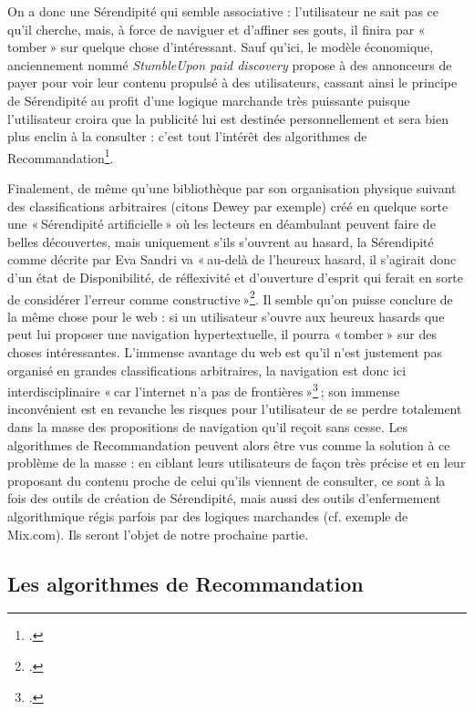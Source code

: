 On a donc une Sérendipité qui semble associative : l’utilisateur ne sait pas ce qu’il cherche, mais, à force de naviguer et d’affiner ses gouts, il finira par « tomber » sur quelque chose d’intéressant. Sauf qu’ici, le modèle économique, anciennement nommé \textit{StumbleUpon paid discovery} propose à des annonceurs de payer pour voir leur contenu propulsé à des utilisateurs, cassant ainsi le principe de Sérendipité au profit d’une logique marchande très puissante puisque l’utilisateur croira que la publicité lui est destinée personnellement et sera bien plus enclin à la consulter : c’est tout l’intérêt des algorithmes de Recommandation\footcite{author2012}.

Finalement, de même qu’une bibliothèque par son organisation physique suivant des classifications arbitraires (citons Dewey par exemple) créé en quelque sorte une « Sérendipité artificielle » où les lecteurs en déambulant peuvent faire de belles découvertes, mais uniquement s’ils s’ouvrent au hasard, la Sérendipité comme décrite par Eva Sandri va « au-delà de l’heureux hasard, il s’agirait donc d’un état de Disponibilité, de réflexivité et d’ouverture d’esprit qui ferait en sorte de considérer l’erreur comme constructive »\footcite[p. 14]{zotero-221}. Il semble qu’on puisse conclure de la même chose pour le web : si un utilisateur s’ouvre aux heureux hasards que peut lui proposer une navigation hypertextuelle, il pourra « tomber » sur des choses intéressantes. L’immense avantage du web est qu’il n’est justement pas organisé en grandes classifications arbitraires, la navigation est donc ici interdisciplinaire « car l’internet n’a pas de frontières »\footcite[8 minutes 34 secondes]{2015} ; son immense inconvénient est en revanche les risques pour l’utilisateur de se perdre totalement dans la masse des propositions de navigation qu’il reçoit sans cesse. Les algorithmes de Recommandation peuvent alors être vus comme la solution à ce problème de la masse : en ciblant leurs utilisateurs de façon très précise et en leur proposant du contenu proche de celui qu’ils viennent de consulter, ce sont à la fois des outils de création de Sérendipité, mais aussi des outils d’enfermement algorithmique régis parfois par des logiques marchandes (cf. exemple de Mix.com). Ils seront l’objet de notre prochaine partie.


\subsection{Les algorithmes de Recommandation}



